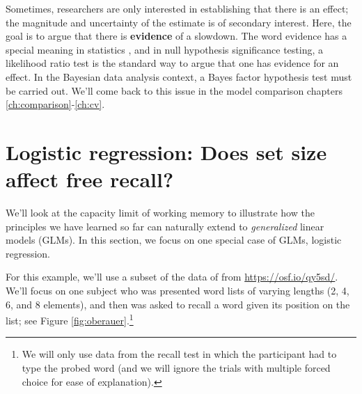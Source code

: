 \documentclass[12pt,]{krantz}
\theoremstyle{definition}
\theoremstyle{definition}
\theoremstyle{definition}
\theoremstyle{remark}
\begin{document}
Sometimes, researchers are only interested in establishing that there is
an effect; the magnitude and uncertainty of the estimate is of secondary
interest. Here, the goal is to argue that there is \textbf{evidence} of
a slowdown. The word evidence has a special meaning in statistics
\citep{Royall}, and in null hypothesis significance testing, a
likelihood ratio test is the standard way to argue that one has evidence
for an effect. In the Bayesian data analysis context, a Bayes factor
hypothesis test must be carried out. We'll come back to this issue in
the model comparison chapters \ref{ch:comparison}-\ref{ch:cv}.

\section{Logistic regression: Does set size affect free
recall?}\label{sec:logistic}

We'll look at the capacity limit of working memory to illustrate how the
principles we have learned so far can naturally extend to
\emph{generalized} linear models (GLMs). In this section, we focus on
one special case of GLMs, logistic regression.

For this example, we'll use a subset of the data of
\citet{oberauerWorkingMemoryCapacity2019} from
\url{https://osf.io/qy5sd/}. We'll focus on one subject who was
presented word lists of varying lengths (2, 4, 6, and 8 elements), and
then was asked to recall a word given its position on the list; see
Figure \ref{fig:oberauer}.\footnote{We will only use data from the
  recall test in which the participant had to type the probed word (and
  we will ignore the trials with multiple forced choice for ease of
  explanation).}
\end{document}
